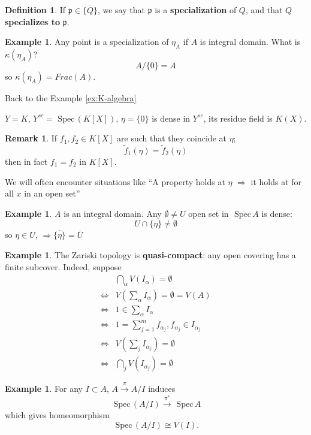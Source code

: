 \documentclass[11pt]{article}
\theoremstyle{definition}
\newtheorem{dfn}[thm]{Definition}
\newtheorem{rmk}[thm]{Remark}
\newtheorem{ex}[thm]{Example}
\newcommand{\spec}{\text{ Spec}\,}
\newcommand{\scp}{{\mathfrak p}}
\newcommand{\Lrta}{\Longrightarrow}
\newcommand{\lrta}{\longrightarrow}
\newcommand{\Llrta}{\Longleftrightarrow}
\begin{document}
\begin{dfn}
If $\scp\in\overline{\{Q\}}$, we say that $\scp$ is a \textbf{specialization} of $Q$, and that $Q$ \textbf{specializes to} $\scp$.
\end{dfn}

\begin{ex}
Any point is a specialization of $\eta_A$ if $A$ is integral domain. What is $\kappa(\eta_A)$?
$$
A/\{0\}=A
$$
so $\kappa(\eta_A)=Frac(A)$.
\end{ex}

Back to the Example \ref{ex:K-algebra}

$Y=K$, $Y^{sc}=\spec (K[X])$, $\eta=\{0\}$ is dense in $Y^{sc}$, its residue field is $K(X)$.

\begin{rmk}
If $f_1,f_2\in K[X]$ are such that they coincide at $\eta$;
$$
\tilde{f}_1(\eta)=\tilde{f}_2(\eta)
$$
then in fact $  f_1=f_2$ in $K[X]$.
\end{rmk}

We will often encounter situations like ``A property holds at $\eta$ $\Lrta$ it holds at for all $x$ in an open set''

\begin{ex}
$A$ is an integral domain. Any $\emptyset \neq U$ open set in $\spec A$ is dense:
$$
U\cap \{\eta\}\neq \emptyset
$$
so $\eta\in U$, $\Lrta \overline{\{\eta\}}=\overline{U}$
\end{ex}

\begin{ex}
The Zariski topology is \textbf{quasi-compact}: any open covering has a finite subcover. Indeed, suppose
$$
\begin{aligned}
&\bigcap_\alpha V(I_\alpha)=\emptyset\\
\Llrta & V(\sum_\alpha I_\alpha)=\emptyset=V(A)\\
\Llrta & 1\in \sum_\alpha I_\alpha\\
\Llrta & 1=\sum_{j=1}^{m} f_{\alpha_j}, f_{\alpha_j}\in I_{\alpha_j}\\
\Llrta & V(\sum_j I_{\alpha_j})=\emptyset\\
\Llrta & \bigcap_j V(I_{\alpha_j})=\emptyset
\end{aligned}
$$
\end{ex}
\begin{ex}
For any $I\subset A$, $A\overset{\pi}{\lrta} A/I$ induces 
$$
\spec (A/I)\overset{\pi^*}{\lrta}\spec A
$$
which  gives homeomorphism 
$$
\spec (A/I)\cong V(I).
$$
\end{ex}
\end{document}
